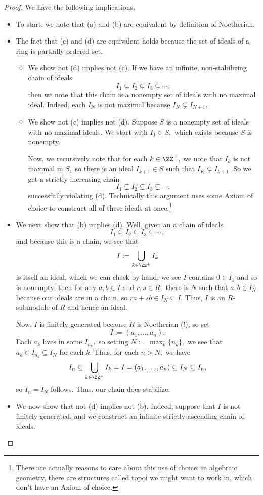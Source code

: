 \begin{proof}
	We have the following implications.
	\begin{itemize}
		\item To start, we note that (a) and (b) are equivalent by definition of Noetherian.
		\item The fact that (c) and (d) are equivalent holds because the set of ideals of a ring is partially ordered set.
		\begin{itemize}
			\item We show not (d) implies not (c). If we have an infinite, non-stabilizing chain of ideals
			\[I_1\subsetneq I_2\subsetneq I_3\subsetneq\cdots,\]
			then we note that this chain is a nonempty set of ideals with no maximal ideal. Indeed, each $I_N$ is not maximal because $I_N\subsetneq I_{N+1}.$
			\item We show not (c) implies not (d). Suppose $S$ is a nonempty set of ideals with no maximal ideals. We start with $I_1\in S,$ which exists because $S$ is nonempty.
			
			Now, we recursively note that for each $k\in\ZZ^+,$ we note that $I_k$ is not maximal in $S,$ so there is an ideal $I_{k+1}\in S$ such that $I_K\subsetneq I_{k+1}.$ So we get a strictly increasing chain
			\[I_1\subsetneq I_2\subsetneq I_3\subsetneq\cdots,\]
			successfully violating (d). Technically this argument uses some Axiom of choice to construct all of these ideals at once.\footnote{There are actually reasons to care about this use of choice: in algebraic geometry, there are structures called topoi we might want to work in, which don't have an Axiom of choice.}
		\end{itemize}
		\item We next show that (b) implies (d). Well, given an a chain of ideals
		\[I_1\subseteq I_2\subseteq I_3\subseteq\cdots,\]
		and because this is a chain, we see that
		\[I:=\bigcup_{k\in\ZZ^+}I_k\]
		is itself an ideal, which we can check by hand: we see $I$ contains $0\in I_1$ and so is nonempty; then for any $a,b\in I$ and $r,s\in R,$ there is $N$ such that $a,b\in I_N$ because our ideals are in a chain, so $ra+sb\in I_N\subseteq I.$ Thus, $I$ is an $R$-submodule of $R$ and hence an ideal.
		
		Now, $I$ is finitely generated because $R$ is Noetherian (!), so set
		\[I:=(a_1,\ldots,a_n).\]
		Each $a_k$ lives in some $I_{n_k},$ so setting $N:=\max_k\{n_k\},$ we see that $a_k\in I_{n_k}\subseteq I_N$ for each $k.$ Thus, for each $n>N,$ we have
		\[I_n\subseteq\bigcup_{k\in\ZZ^+}I_k=I=(a_1,\ldots,a_n)\subseteq I_N\subseteq I_n,\]
		so $I_n=I_N$ follows. Thus, our chain does stabilize.
		\item We now show that not (d) implies not (b). Indeed, suppose that $I$ is not finitely generated, and we construct an infinite strictly ascending chain of ideals.
		

\end{itemize}
\end{proof}
